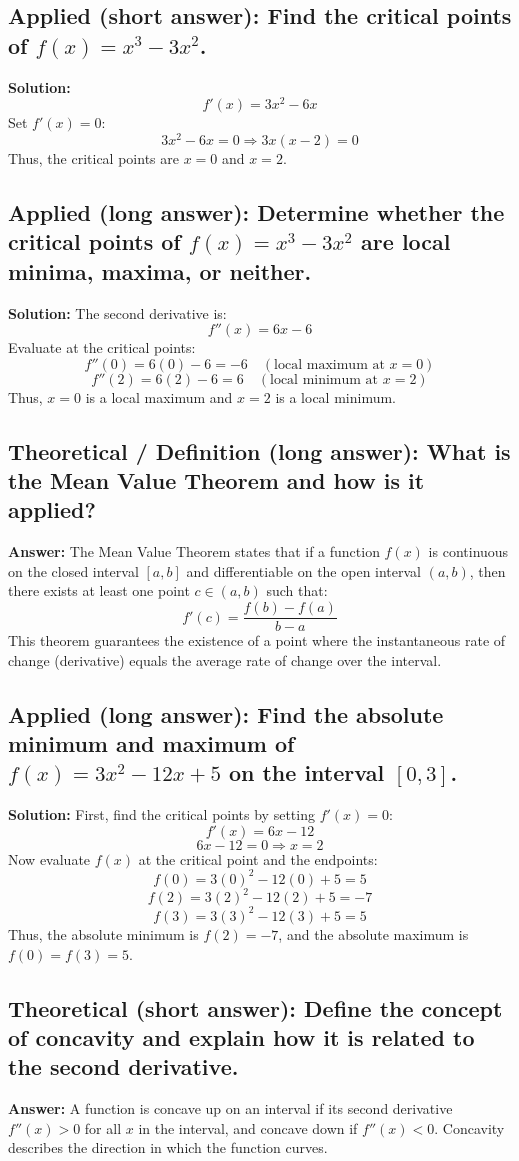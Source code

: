 \documentclass[12pt]{article}
\begin{document}
\subsection{Applied (short answer): Find the critical points of \( f(x) = x^3 - 3x^2 \).}
\textbf{Solution:}
\[
f'(x) = 3x^2 - 6x
\]
Set \( f'(x) = 0 \):
\[
3x^2 - 6x = 0 \Rightarrow 3x(x - 2) = 0
\]
Thus, the critical points are \( x = 0 \) and \( x = 2 \).

\subsection{Applied (long answer): Determine whether the critical points of \( f(x) = x^3 - 3x^2 \) are local minima, maxima, or neither.}
\textbf{Solution:}
The second derivative is:
\[
f''(x) = 6x - 6
\]
Evaluate at the critical points:
\[
f''(0) = 6(0) - 6 = -6 \quad (\text{local maximum at } x = 0)
\]
\[
f''(2) = 6(2) - 6 = 6 \quad (\text{local minimum at } x = 2)
\]
Thus, \( x = 0 \) is a local maximum and \( x = 2 \) is a local minimum.

\subsection{Theoretical / Definition (long answer): What is the Mean Value Theorem and how is it applied?}
\textbf{Answer:} The Mean Value Theorem states that if a function \( f(x) \) is continuous on the closed interval \([a, b]\) and differentiable on the open interval \((a, b)\), then there exists at least one point \( c \in (a, b) \) such that:
\[
f'(c) = \frac{f(b) - f(a)}{b - a}
\]
This theorem guarantees the existence of a point where the instantaneous rate of change (derivative) equals the average rate of change over the interval.

\subsection{Applied (long answer): Find the absolute minimum and maximum of \( f(x) = 3x^2 - 12x + 5 \) on the interval \( [0, 3] \).}
\textbf{Solution:}
First, find the critical points by setting \( f'(x) = 0 \):
\[
f'(x) = 6x - 12
\]
\[
6x - 12 = 0 \Rightarrow x = 2
\]
Now evaluate \( f(x) \) at the critical point and the endpoints:
\[
f(0) = 3(0)^2 - 12(0) + 5 = 5
\]
\[
f(2) = 3(2)^2 - 12(2) + 5 = -7
\]
\[
f(3) = 3(3)^2 - 12(3) + 5 = 5
\]
Thus, the absolute minimum is \( f(2) = -7 \), and the absolute maximum is \( f(0) = f(3) = 5 \).

\subsection{Theoretical (short answer): Define the concept of concavity and explain how it is related to the second derivative.}
\textbf{Answer:} A function is concave up on an interval if its second derivative \( f''(x) > 0 \) for all \( x \) in the interval, and concave down if \( f''(x) < 0 \). Concavity describes the direction in which the function curves.
\end{document}
